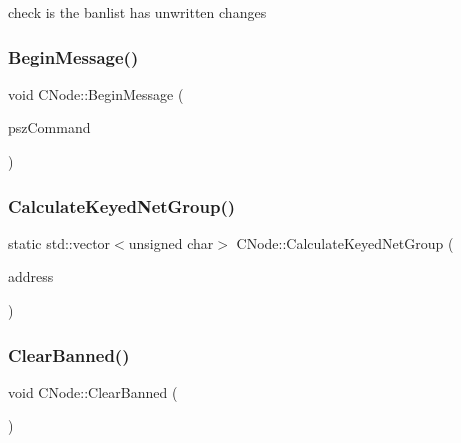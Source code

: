 check is the banlist has unwritten changes 

\mbox{\label{class_c_node_af76d193027757002321d0d674290b955}} 
\subsubsection{\texorpdfstring{Begin\+Message()}{BeginMessage()}}
{\footnotesize\ttfamily void C\+Node\+::\+Begin\+Message (\begin{DoxyParamCaption}\item[{const char $\ast$}]{psz\+Command }\end{DoxyParamCaption})}

\mbox{\label{class_c_node_ac3c38e33662ffa6fe861839baecf1b29}} 
\subsubsection{\texorpdfstring{Calculate\+Keyed\+Net\+Group()}{CalculateKeyedNetGroup()}}
{\footnotesize\ttfamily static std\+::vector$<$unsigned char$>$ C\+Node\+::\+Calculate\+Keyed\+Net\+Group (\begin{DoxyParamCaption}\item[{\mbox{\hyperlink{class_c_address}{C\+Address}} \&}]{address }\end{DoxyParamCaption})\hspace{0.3cm}{\ttfamily [static]}}

\mbox{\label{class_c_node_ad75b43ab81213b74446163211c24246a}} 
\subsubsection{\texorpdfstring{Clear\+Banned()}{ClearBanned()}}
{\footnotesize\ttfamily void C\+Node\+::\+Clear\+Banned (\begin{DoxyParamCaption}{ }\end{DoxyParamCaption})\hspace{0.3cm}{\ttfamily [static]}}

